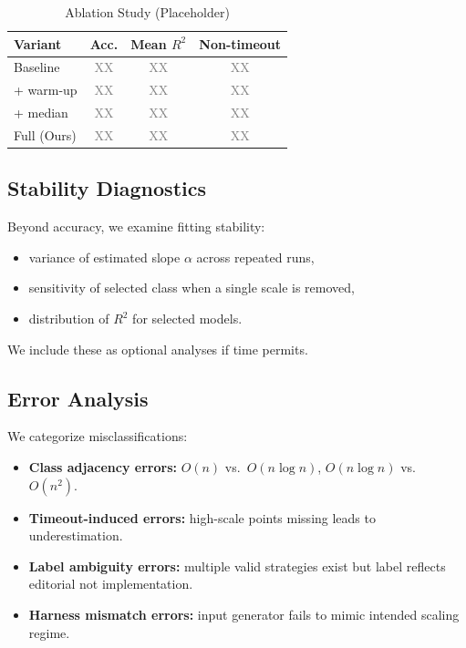 \documentclass[conference]{IEEEtran}
\newcommand{\ours}{Ours}
\newcommand{\baseline}{Baseline}
\newcommand{\placeholder}{\textcolor{gray}{XX}}
\begin{document}
\begin{table}[t]
\centering
\caption{Ablation Study (Placeholder)}
\label{tab:ablation}
\begin{tabular}{lccc}
\toprule
Variant & Acc. & Mean $R^2$ & Non-timeout \\
\midrule
\baseline & \placeholder & \placeholder & \placeholder \\
+ warm-up & \placeholder & \placeholder & \placeholder \\
+ median & \placeholder & \placeholder & \placeholder \\
Full (\ours) & \placeholder & \placeholder & \placeholder \\
\bottomrule
\end{tabular}
\end{table}

\subsection{Stability Diagnostics}

Beyond accuracy, we examine fitting stability:
\begin{itemize}[leftmargin=1.2em]
\item variance of estimated slope $\alpha$ across repeated runs,
\item sensitivity of selected class when a single scale is removed,
\item distribution of $R^2$ for selected models.
\end{itemize}

We include these as optional analyses if time permits.

\subsection{Error Analysis}

We categorize misclassifications:
\begin{itemize}[leftmargin=1.2em]
\item \textbf{Class adjacency errors:} $O(n)$ vs.\ $O(n\log n)$, $O(n\log n)$ vs.\ $O(n^2)$.
\item \textbf{Timeout-induced errors:} high-scale points missing leads to
underestimation.
\item \textbf{Label ambiguity errors:} multiple valid strategies exist but label
reflects editorial not implementation.
\item \textbf{Harness mismatch errors:} input generator fails to mimic intended
scaling regime.
\end{itemize}
\end{document}
